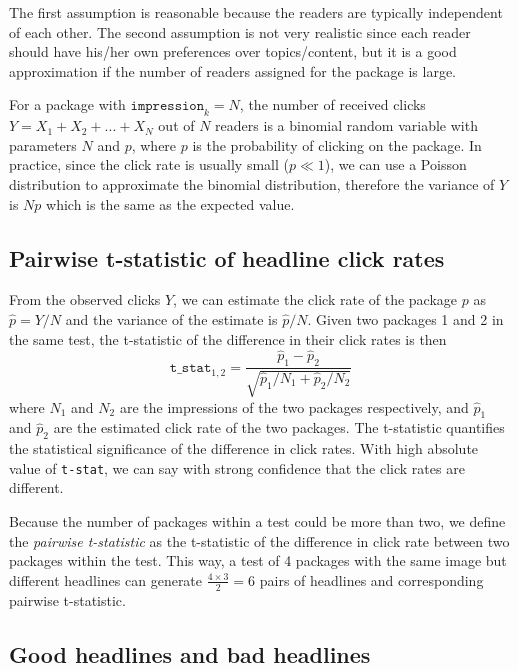 \documentclass[%
preprint,
 amsmath,amssymb,
 aps,
]{revtex4-2}
\begin{document}
The first assumption is reasonable because the readers are typically independent of each other. The second assumption is not very realistic since each reader should have his/her own preferences over topics/content, but it is a good approximation if the number of readers assigned for the package is large.

For a package with \(\texttt{impression}_k = N\), the number of received clicks \(Y = X_1 + X_2 + ... + X_N \) out of \(N\) readers is a binomial random variable with parameters \(N\) and \(p\), where $p$ is the probability of clicking on the package.
In practice, since the click rate is usually small (\(p\ll 1\)), we can use a Poisson distribution to approximate the binomial distribution, therefore the variance of \(Y\) is $Np$ which is the same as the expected value.

\subsection{Pairwise t-statistic of headline click rates}

From the observed clicks \(Y\), we can estimate the click rate of the package \(p\) as \(\hat{p} = Y/N\) and the variance of the estimate is \(\hat{p}/N\).
Given two packages 1 and 2 in the same test, the t-statistic of the difference in their click rates is then
\begin{equation}
    \texttt{t\_stat}_{1, 2} = \frac{\hat{p}_1 - \hat{p}_2}{\sqrt{\hat{p}_1/N_1 + \hat{p}_2/N_2}}
\end{equation}
where \(N_1\) and \(N_2\) are the impressions of the two packages respectively, and \(\hat{p}_1\) and \(\hat{p}_2\) are the estimated click rate of the two packages.
The t-statistic quantifies the statistical significance of the difference in click rates. 
With high absolute value of \texttt{t-stat}, we can say with strong confidence that the click rates are different.

Because the number of packages within a test could be more than two, we define the \textit{pairwise t-statistic} as the t-statistic of the difference in click rate between two packages within the test.
This way, a test of 4 packages with the same image but different headlines can generate \(\frac{4\times 3}{2} = 6\) pairs of headlines and corresponding pairwise t-statistic.

\subsection{Good headlines and bad headlines}
\end{document}

